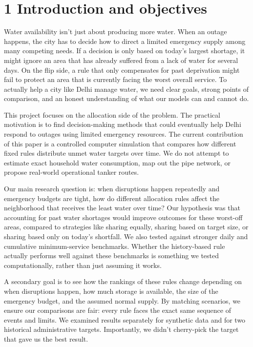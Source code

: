\documentclass[conference]{IEEEtran}
\begin{document}
\section{1 Introduction and objectives}
Water availability isn't just about producing more water. When an outage happens, the city has to decide how to direct a limited emergency supply among many competing needs. If a decision is only based on today's largest shortage, it might ignore an area that has already suffered from a lack of water for several days. On the flip side, a rule that only compensates for past deprivation might fail to protect an area that is currently facing the worst overall service. To actually help a city like Delhi manage water, we need clear goals, strong points of comparison, and an honest understanding of what our models can and cannot do.

This project focuses on the allocation side of the problem. The practical motivation is to find decision-making methods that could eventually help Delhi respond to outages using limited emergency resources. The current contribution of this paper is a controlled computer simulation that compares how different fixed rules distribute unmet water targets over time. We do not attempt to estimate exact household water consumption, map out the pipe network, or propose real-world operational tanker routes.

Our main research question is: when disruptions happen repeatedly and emergency budgets are tight, how do different allocation rules affect the neighborhood that receives the least water over time? Our hypothesis was that accounting for past water shortages would improve outcomes for these worst-off areas, compared to strategies like sharing equally, sharing based on target size, or sharing based only on today's shortfall. We also tested against stronger daily and cumulative minimum-service benchmarks. Whether the history-based rule actually performs well against these benchmarks is something we tested computationally, rather than just assuming it works.

A secondary goal is to see how the rankings of these rules change depending on when disruptions happen, how much storage is available, the size of the emergency budget, and the assumed normal supply. By matching scenarios, we ensure our comparisons are fair: every rule faces the exact same sequence of events and limits. We examined results separately for synthetic data and for two historical administrative targets. Importantly, we didn't cherry-pick the target that gave us the best result.
\end{document}
